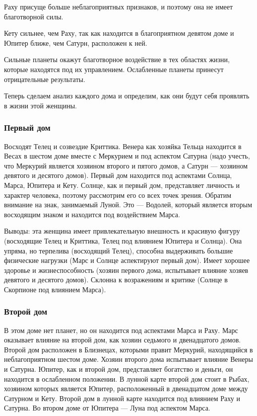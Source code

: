Раху присуще больше неблагоприятных признаков, и поэтому она не имеет благотворной силы.

Кету сильнее, чем Раху, так как находится в благоприятном девятом доме и Юпитер ближе, чем Сатурн, расположен к ней.

Сильные планеты окажут благотворное воздействие в тех областях жизни, которые находятся под их управлением. Ослабленные планеты принесут отрицательные результаты.

Теперь сделаем анализ каждого дома и определим, как они будут  себя проявлять в жизни этой женщины.

\subsubsection*{Первый дом}
Восходят Телец и созвездие Криттика. Венера как хозяйка Тельца находится в Весах в шестом доме вместе с Меркурием и под аспектом Сатурна (надо учесть, что Меркурий является хозяином второго и пятого домов, а Сатурн --- хозяином девятого и десятого домов). Первый дом находится под аспектами Солнца, Марса, Юпитера и Кету. Солнце, как и первый дом, представляет личность и характер человека, поэтому рассмотрим его со всех точек зрения. Обратим внимание на знак, занимаемый Луной. Это --- Водолей, который является вторым восходящим знаком и находится под воздействием Марса.

Выводы: эта женщина имеет привлекательную внешность и красивую фигуру (восходящие Телец и Криттика, Телец под влиянием Юпитера и Солнца). Она упряма, но терпелива (восходящий Телец), способна выдерживать большие физические нагрузки (Марс и Солнце аспектируют первый дом). Имеет хорошее здоровье и жизнеспособность (хозяин первого дома, испытывает влияние хозяев девятого и десятого домов). Склонна к возражениям и критике (Солнце в Скорпионе под влиянием Марса).

\subsubsection*{Второй дом}
В этом доме нет планет, но он находится под аспектами Марса и Раху. Марс оказывает влияние на второй дом, как хозяин седьмого и двенадцатого домов. Второй дом расположен в Близнецах, которыми правит Меркурий, находящийся в неблагоприятном шестом доме. Хозяин второго дома испытывает влияние Венеры и Сатурна. Юпитер, как и второй дом, представляет богатство и деньги, он находится в ослабленном положении. В лунной карте второй дом стоит в Рыбах, хозяином которых является Юпитер, расположенный в двенадцатом доме между Сатурном и Кету. Второй дом в лунной карте находится под влиянием Раху и Сатурна. Во втором доме от Юпитера --- Луна под аспектом Марса.


